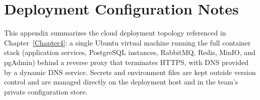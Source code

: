 \chapter{Deployment Configuration Notes}
\label{Appendix2}

This appendix summarizes the cloud deployment topology referenced in Chapter~\ref{Chapter4}: a single Ubuntu virtual machine running the full container stack (application services, PostgreSQL instances, RabbitMQ, Redis, MinIO, and pgAdmin) behind a reverse proxy that terminates HTTPS, with DNS provided by a dynamic DNS service. Secrets and environment files are kept outside version control and are managed directly on the deployment host and in the team's private configuration store.
